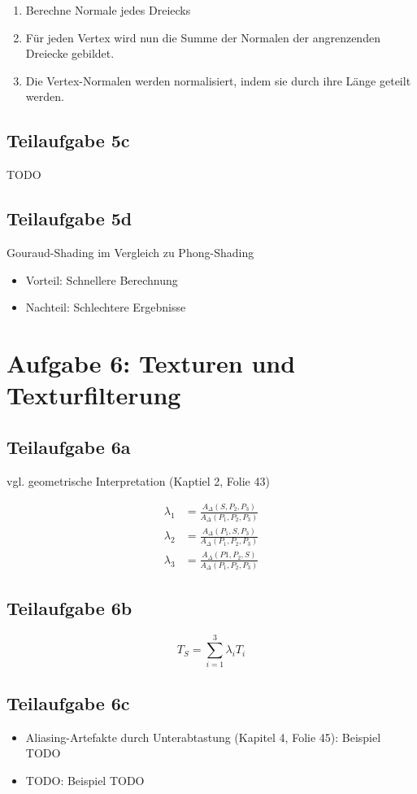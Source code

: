 \documentclass[a4paper]{scrartcl}
\begin{document}
\begin{enumerate}
    \item Berechne Normale jedes Dreiecks
    \item Für jeden Vertex wird nun die Summe der Normalen der angrenzenden Dreiecke gebildet.
    \item Die Vertex-Normalen werden normalisiert, indem sie durch ihre Länge geteilt werden.
\end{enumerate}

\subsection*{Teilaufgabe 5c}
TODO

\subsection*{Teilaufgabe 5d}
Gouraud-Shading im Vergleich zu Phong-Shading
\begin{itemize}
    \item Vorteil: Schnellere Berechnung
    \item Nachteil: Schlechtere Ergebnisse
\end{itemize}


\section*{Aufgabe 6: Texturen und Texturfilterung}
\subsection*{Teilaufgabe 6a}
vgl. geometrische Interpretation (Kaptiel 2, Folie 43)

\begin{align}
    \lambda_1 &= \frac{A_\Delta(S, P_2, P_3)}{A_\Delta(P_1, P_2, P_3)}\\
    \lambda_2 &= \frac{A_\Delta(P_1, S, P_3)}{A_\Delta(P_1, P_2, P_3)}\\
    \lambda_3 &= \frac{A_\Delta(P1, P_2, S)}{A_\Delta(P_1, P_2, P_3)}
\end{align}


\subsection*{Teilaufgabe 6b}
\[T_S = \sum_{i=1}^3 \lambda_i T_i\]

\subsection*{Teilaufgabe 6c}
\begin{itemize}
    \item Aliasing-Artefakte durch Unterabtastung (Kapitel 4, Folie 45): Beispiel TODO
    \item TODO: Beispiel TODO
\end{itemize}
\end{document}
